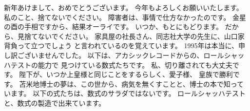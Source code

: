 \documentclass{jsarticle}
\begin{document}
\title{}
\author{}
\date{}
\maketitle
\thispagestyle{empty}

    \newcommand{\variint}{%
	\begin{picture}(15,30)
		\put(0,0){
			$ \iint $}
		\put(0,5){\line(15,0){15}}
	\end{picture} %
}

\newcommand{\variiint}{%
	\begin{picture}(15,15)
		\put(0,0){
			$ \iiint $}
		\put(0,5){\line(15,0){20}}
	\end{picture} %
}



 \newcommand{\alearletter}{%
	 \begin{picture}(10,20)
		 \put(0,0){
			 $ \square $}
		 \put(0,0){\line(1,1){10}}
	 \end{picture} %
	 }

\newcommand{\letter}{%
	\begin{picture}(5,5)
		\put(0,0){
			$ \square $}
		\put(3,3){$\vee$}
	\end{picture} %
}
 \newcommand{\secproduct}{%
	 \begin{picture}(10,20)
		 \put(0,0){
			 $ \nabla $}
		 \put(5,0){+}
	 \end{picture} %
	 }
 \newcommand{\average}{%
	 \begin{picture}(5,5)
		 \put(0,0){
			 $ \square $}
		 \put(3,3){$\slash$}
	 \end{picture} %
	 }
\newcommand{\averagesqrt}{%
	 \begin{picture}(5,5)
		 \put(0,0){
			 $ \square $}
		 \put(3,3){$\setminus $}
	 \end{picture} %
	 }




新年あけまして、おめでとうございます。
今年もよろしくお願いいたします。
私のこと、捨てないでください。
障害者は、事情で仕方なかったのです。
金星の酉の手相ですから、結果オーライです。
いつか、もとにもどります。
だから、見捨てないでください。
家具屋の社長さん、同志社大学の先生に、山口家背負って立つでしょう
と言われているのを覚えています。
1995年は本当に、申し訳ございませんでした。
以下は、アカシックレコードからの、ロールシャッハテストの能力で
見つけている数式たちです。
私、切り離されても大丈夫です。
陛下が、いつか上皇様と同じことをするらしく、愛子様、
皇族で勝利です。
苫米地博士の夢は、この世から、病気を無くすことと、博士の本で知っています。
以下の式たちは、数式のサラダではないです。
ロールシャッハテストと、数式の製造で出来ています。
\end{document}
